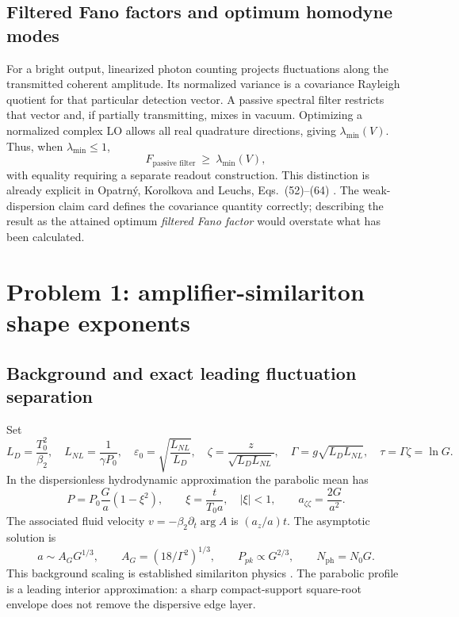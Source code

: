 \documentclass[11pt,a4paper]{article}
\newcommand{\Nph}{N_{\mathrm{ph}}}
\newcommand{\eps}{\varepsilon}
\begin{document}
\subsection{Filtered Fano factors and optimum homodyne modes}

For a bright output, linearized photon counting projects fluctuations along the transmitted coherent amplitude. Its normalized variance is a covariance Rayleigh quotient for that particular detection vector. A passive spectral filter restricts that vector and, if partially transmitting, mixes in vacuum. Optimizing a normalized complex LO allows all real quadrature directions, giving $\lambda_{\min}(V)$. Thus, when $\lambda_{\min}\le1$,
\begin{equation}\label{eq:filterbound}
F_{\text{passive filter}}\ \ge\ \lambda_{\min}(V),
\end{equation}
with equality requiring a separate readout construction. This distinction is already explicit in Opatrn\'y, Korolkova and Leuchs, Eqs.\ (52)--(64) \cite{opatrny}. The weak-dispersion claim card defines the covariance quantity correctly; describing the result as the attained optimum \emph{filtered Fano factor} would overstate what has been calculated.

\section{Problem 1: amplifier-similariton shape exponents}

\subsection{Background and exact leading fluctuation separation}

Set
\begin{equation}
L_D=\frac{T_0^2}{\beta_2},\quad L_{NL}=\frac1{\gamma P_0},\quad
\eps_0=\sqrt{\frac{L_{NL}}{L_D}},\quad
\zeta=\frac z{\sqrt{L_DL_{NL}}},\quad \Gamma=g\sqrt{L_DL_{NL}},\quad
\tau=\Gamma\zeta=\ln G.
\end{equation}
In the dispersionless hydrodynamic approximation the parabolic mean has
\begin{equation}\label{eq:parabola}
P=P_0\frac G{a}(1-\xi^2),\qquad \xi=\frac{t}{T_0a},\quad |\xi|<1,
\qquad a_{\zeta\zeta}=\frac{2G}{a^2}.
\end{equation}
The associated fluid velocity $v=-\beta_2\partial_t\arg A$ is $(a_z/a)t$. The asymptotic solution is
\begin{equation}\label{eq:asymwidth}
a\sim A_GG^{1/3},\qquad A_G=(18/\Gamma^2)^{1/3},\qquad P_{pk}\propto G^{2/3},\qquad \Nph=N_0G.
\end{equation}
This background scaling is established similariton physics \cite{fermann,kruglov}. The parabolic profile is a leading interior approximation: a sharp compact-support square-root envelope does not remove the dispersive edge layer.
\end{document}
